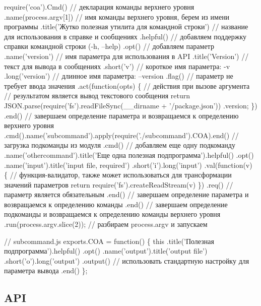 \begin{DoxyCode}
require('coa').Cmd() // декларация команды верхнего уровня
    .name(process.argv[1]) // имя команды верхнего уровня, берем из имени программы
    .title('Жутко полезная утилита для командной строки') // название для использования в справке и
       сообщениях
    .helpful() // добавляем поддержку справки командной строки (-h, --help)
    .opt() // добавляем параметр
        .name('version') // имя параметра для использования в API
        .title('Version') // текст для вывода в сообщениях
        .short('v') // короткое имя параметра: -v
        .long('version') // длинное имя параметра: --version
        .flag() // параметр не требует ввода значения
        .act(function(opts) \{  // действия при вызове аргумента
            // результатом является вывод текстового сообщения
            return JSON.parse(require('fs').readFileSync(\_\_dirname + '/package.json'))
                .version;
        \})
        .end() // завершаем определение параметра и возвращаемся к определению верхнего уровня
    .cmd().name('subcommand').apply(require('./subcommand').COA).end() // загрузка подкоманды из модуля
    .cmd() // добавляем еще одну подкоманду
        .name('othercommand').title('Еще одна полезная подпрограмма').helpful()
        .opt()
            .name('input').title('input file, required')
            .short('i').long('input')
            .val(function(v) \{ // функция-валидатор, также может использоваться для трансформации значений
       параметров
                return require('fs').createReadStream(v) \})
            .req() // параметр является обязательным
            .end() // завершаем определение параметра и возвращаемся к определению команды
        .end() // завершаем определение подкоманды и возвращаемся к определению команды верхнего уровня
    .run(process.argv.slice(2)); // разбираем process.argv и запускаем
\end{DoxyCode}



\begin{DoxyCode}
// subcommand.js
exports.COA = function() \{
    this
        .title('Полезная подпрограмма').helpful()
        .opt()
            .name('output').title('output file')
            .short('o').long('output')
            .output() // использовать стандартную настройку для параметра вывода
            .end()
\};
\end{DoxyCode}


\subsection*{A\+PI}

